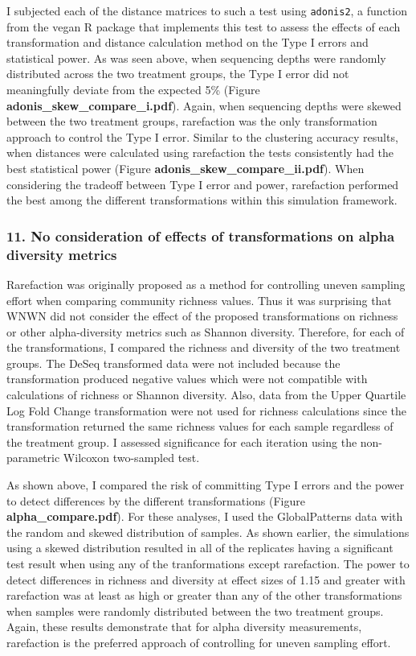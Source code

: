 \documentclass[
]{article}
\begin{document}
I subjected each of the distance matrices to such a test using
\texttt{adonis2}, a function from the vegan R package that implements
this test to assess the effects of each transformation and distance
calculation method on the Type I errors and statistical power. As was
seen above, when sequencing depths were randomly distributed across the
two treatment groups, the Type I error did not meaningfully deviate from
the expected 5\% (Figure \textbf{adonis\_skew\_compare\_i.pdf}). Again,
when sequencing depths were skewed between the two treatment groups,
rarefaction was the only transformation approach to control the Type I
error. Similar to the clustering accuracy results, when distances were
calculated using rarefaction the tests consistently had the best
statistical power (Figure \textbf{adonis\_skew\_compare\_ii.pdf}). When
considering the tradeoff between Type I error and power, rarefaction
performed the best among the different transformations within this
simulation framework.

\hypertarget{no-consideration-of-effects-of-transformations-on-alpha-diversity-metrics}{%
\subsubsection{11. No consideration of effects of transformations on
alpha diversity
metrics}\label{no-consideration-of-effects-of-transformations-on-alpha-diversity-metrics}}

Rarefaction was originally proposed as a method for controlling uneven
sampling effort when comparing community richness values. Thus it was
surprising that WNWN did not consider the effect of the proposed
transformations on richness or other alpha-diversity metrics such as
Shannon diversity. Therefore, for each of the transformations, I
compared the richness and diversity of the two treatment groups. The
DeSeq transformed data were not included because the transformation
produced negative values which were not compatible with calculations of
richness or Shannon diversity. Also, data from the Upper Quartile Log
Fold Change transformation were not used for richness calculations since
the transformation returned the same richness values for each sample
regardless of the treatment group. I assessed significance for each
iteration using the non-parametric Wilcoxon two-sampled test.

As shown above, I compared the risk of committing Type I errors and the
power to detect differences by the different transformations (Figure
\textbf{alpha\_compare.pdf}). For these analyses, I used the
GlobalPatterns data with the random and skewed distribution of samples.
As shown earlier, the simulations using a skewed distribution resulted
in all of the replicates having a significant test result when using any
of the tranformations except rarefaction. The power to detect
differences in richness and diversity at effect sizes of 1.15 and
greater with rarefaction was at least as high or greater than any of the
other transformations when samples were randomly distributed between the
two treatment groups. Again, these results demonstrate that for alpha
diversity measurements, rarefaction is the preferred approach of
controlling for uneven sampling effort.
\end{document}
